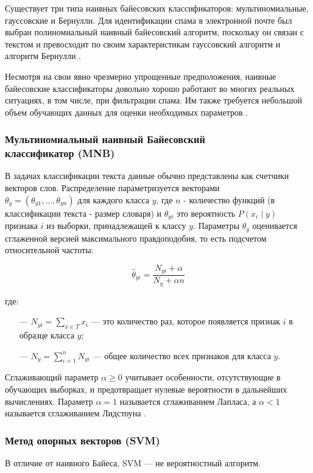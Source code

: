 Существует три типа наивных байесовских классификаторов: мультиномиальные,
гауссовские и Бернулли. Для идентификации спама в электронной почте
был выбран полиномиальный наивный байесовский алгоритм, поскольку он
связан с текстом и превосходит по своим характеристикам гауссовский
алгоритм и алгоритм Бернулли \cite{IEEE}.

Несмотря на свои явно чрезмерно упрощенные предположения,
наивные байесовские классификаторы довольно хорошо работают
во многих реальных ситуациях, в том числе, при фильтрации
спама. Им также требуется небольшой объем обучающих
данных для оценки необходимых параметров \cite{scikitMNB}.

\subsubsection{Мультиномиальный наивный Байесовский \\ классификатор (MNB)}
В задачах классификации текста данные обычно представлены как счетчики векторов слов.
Распределение параметризуется векторами \\ $\theta_y = (\theta_{y1},\ldots,\theta_{yn})$
для каждого класса ${y}$, где ${n}$ - количество функций (в
классификации текста - размер словаря) и $\theta_{yi}$ это вероятность
$P(x_i \mid y)$ признака ${i}$ из выборки, принадлежащей к классу ${y}$.
Параметры $\theta_y$ оценивается сглаженной версией максимального правдоподобия,
то есть подсчетом относительной частоты:

\begin{equation}\label{eq4}
    \hat{\theta}_{yi} = \frac{ N_{yi} + \alpha}{N_y + \alpha n}
\end{equation}

где:
\begin{itemize}
    \item[—] $N_{yi} = \sum_{x \in T} x_i$ — это количество раз,
        которое появляется признак ${i}$ в образце класса ${y}$;
    \item[—] $N_{y} = \sum_{i=1}^{n} N_{yi}$ — общее количество всех признаков для класса ${y}$.
\end{itemize}

Сглаживающий параметр $\alpha \ge 0$ учитывает особенности, отсутствующие
в обучающих выборках, и предотвращает нулевые вероятности в дальнейших
вычислениях. Параметр $\alpha = 1$ называется сглаживанием Лапласа, а $\alpha < 1$
называется сглаживанием Лидстоуна \cite{scikitMNB}.

\subsubsection{Метод опорных векторов (SVM)}
В отличие от наивного Байеса, SVM — не вероятностный алгоритм.

